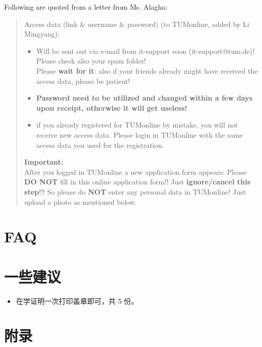 \documentclass{article}
\begin{document}
Following are quoted from a letter from Ms. Alagha:
\begin{quotation}
Access data (link \& username \& password) {\color{gray}(to TUMonline, added by Li Mingyang)}:
\begin{itemize}
\renewcommand\labelitemi{--}  %
\item Will be sent out via e-mail from it-support soon (it-support@tum.de)!
Please check also your spam folder!\\
Please \textbf{wait for it}: also if your friends already might have received the access data, please be patient!
\item \textbf{Password need to be {\color{blue}utilized and changed within a few days upon receipt}, otherwise it will get useless!}
\item if you already registered for TUMonline by mistake, you will not receive new access data. Please login in TUMonline with the same access data you used for the registration.
\end{itemize}
 
\textbf{Important:}\\
After you logged in TUMonline a new application form appears: Please \textbf{DO NOT} fill in this online application form!! Just \textbf{\color{blue}ignore/cancel this step}!!! So please do \textbf{NOT} enter any personal data in TUMonline! Just upload a photo as mentioned below.
\end{quotation}

\section{FAQ}

\section{一些建议}
\begin{itemize}
  \item 在学证明一次打印盖章即可，共 5 份。
\end{itemize}

\section{附录}\label{ap}
\newpage
\end{document}
